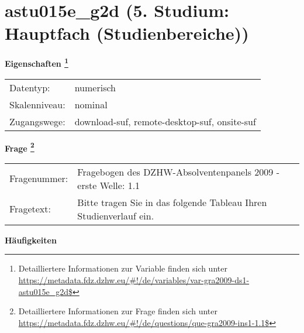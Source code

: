 
    \setcounter{footnote}{0}

    \vspace*{-1.8cm}
	\section{astu015e\_g2d (5. Studium: Hauptfach (Studienbereiche))}
	\label{section:astu015e_g2d}



    \vspace*{0.5cm}
    \noindent\textbf{Eigenschaften
	\footnote{Detailliertere Informationen zur Variable finden sich unter
		\url{https://metadata.fdz.dzhw.eu/\#!/de/variables/var-gra2009-ds1-astu015e_g2d$}}}\\
	\begin{tabularx}{\hsize}{@{}lX}
	Datentyp: & numerisch \\
	Skalenniveau: & nominal \\
	Zugangswege: &
	  download-suf, 
	  remote-desktop-suf, 
	  onsite-suf
 \\
    \end{tabularx}



				\vspace*{0.5cm}
                \noindent\textbf{Frage
	                \footnote{Detailliertere Informationen zur Frage finden sich unter
		              \url{https://metadata.fdz.dzhw.eu/\#!/de/questions/que-gra2009-ins1-1.1$}}}\\
				\begin{tabularx}{\hsize}{@{}lX}
					Fragenummer: &
					  Fragebogen des DZHW-Absolventenpanels 2009 - erste Welle:
					  1.1
 \\
					Fragetext: & Bitte tragen Sie in das folgende Tableau Ihren Studienverlauf ein. \\
				\end{tabularx}





        		\vspace*{0.5cm}
                \noindent\textbf{Häufigkeiten}

